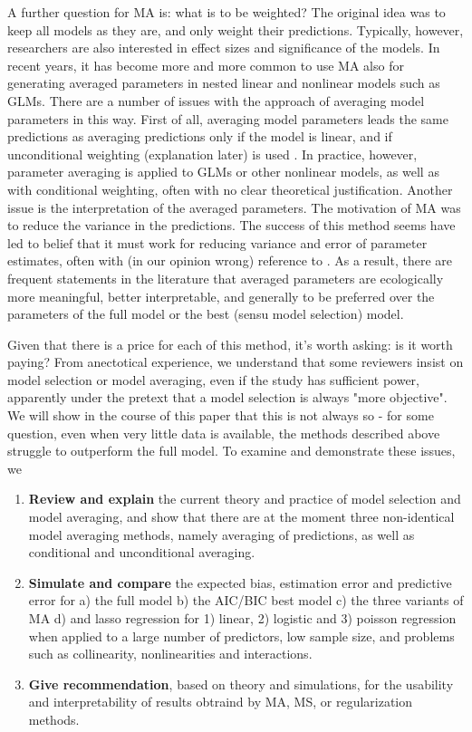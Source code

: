 \documentclass[5p]{elsarticle}
\begin{document}
A further question for MA is: what is to be weighted? The original idea was to keep all models as they are, and only weight their predictions. Typically, however, researchers are also interested in effect sizes and significance of the models. In recent years, it has become more and more common to use MA also for generating averaged parameters in nested linear and nonlinear models such as GLMs. There are a number of issues with the approach of averaging model parameters in this way. First of all, averaging model parameters leads the same predictions as averaging predictions only if the model is linear, and if unconditional weighting (explanation later) is used \citep{Burnham-Modelselectionand-2002}. In practice, however, parameter averaging is applied to GLMs or other nonlinear models, as well as with conditional weighting, often with no clear theoretical justification. Another issue is the interpretation of the averaged parameters. The motivation of MA was to reduce the variance in the predictions. The success of this method seems have led to belief that it must work for reducing variance and error of parameter estimates, often with (in our opinion wrong) reference to \citet{Burnham-Modelselectionand-2002}. As a result, there are frequent statements in the literature that averaged parameters are ecologically more meaningful, better interpretable, and generally to be preferred over the parameters of the full model or the best (sensu model selection) model.

Given that there is a price for each of this method, it's worth asking: is it worth paying? From anectotical experience, we understand that some reviewers insist on model selection or model averaging, even if the study has sufficient power, apparently under the pretext that a model selection is always "more objective". We will show in the course of this paper that this is not always so - for some question, even when very little data is available, the methods described above struggle to outperform the full model. To examine and demonstrate these issues, we 

\begin{enumerate}
\item \textbf{Review and explain} the current theory and practice of model selection and model averaging, and show that there are at the moment three non-identical model averaging methods, namely averaging of predictions, as well as conditional and unconditional averaging. 
\item \textbf{Simulate and compare} the expected bias, estimation error and predictive error for a) the full model b) the AIC/BIC best model c) the three variants of MA d) and lasso regression for 1) linear, 2) logistic and 3) poisson regression when applied to a large number of predictors, low sample size, and problems such as collinearity, nonlinearities and interactions. 
\item \textbf{Give recommendation}, based on theory and simulations, for the usability and interpretability of results obtraind by MA, MS, or regularization methods.  
\end{enumerate}
\end{document}
